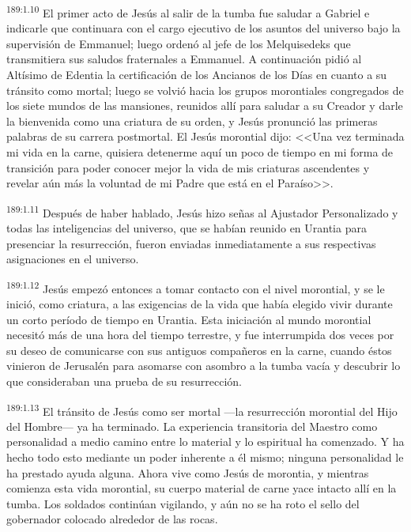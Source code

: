 \par 
\textsuperscript{189:1.10} El primer acto de Jesús al salir de la tumba fue saludar a Gabriel e indicarle que continuara con el cargo ejecutivo de los asuntos del universo bajo la supervisión de Emmanuel; luego ordenó al jefe de los Melquisedeks que transmitiera sus saludos fraternales a Emmanuel. A continuación pidió al Altísimo de Edentia la certificación de los Ancianos de los Días en cuanto a su tránsito como mortal; luego se volvió hacia los grupos morontiales congregados de los siete mundos de las mansiones, reunidos allí para saludar a su Creador y darle la bienvenida como una criatura de su orden, y Jesús pronunció las primeras palabras de su carrera postmortal. El Jesús morontial dijo: <<Una vez terminada mi vida en la carne, quisiera detenerme aquí un poco de tiempo en mi forma de transición para poder conocer mejor la vida de mis criaturas ascendentes y revelar aún más la voluntad de mi Padre que está en el Paraíso>>.

\par 
\textsuperscript{189:1.11} Después de haber hablado, Jesús hizo señas al Ajustador Personalizado y todas las inteligencias del universo, que se habían reunido en Urantia para presenciar la resurrección, fueron enviadas inmediatamente a sus respectivas asignaciones en el universo.

\par 
\textsuperscript{189:1.12} Jesús empezó entonces a tomar contacto con el nivel morontial, y se le inició, como criatura, a las exigencias de la vida que había elegido vivir durante un corto período de tiempo en Urantia. Esta iniciación al mundo morontial necesitó más de una hora del tiempo terrestre, y fue interrumpida dos veces por su deseo de comunicarse con sus antiguos compañeros en la carne, cuando éstos vinieron de Jerusalén para asomarse con asombro a la tumba vacía y descubrir lo que consideraban una prueba de su resurrección.

\par 
\textsuperscript{189:1.13} El tránsito de Jesús como ser mortal ---la resurrección morontial del Hijo del Hombre--- ya ha terminado. La experiencia transitoria del Maestro como personalidad a medio camino entre lo material y lo espiritual ha comenzado. Y ha hecho todo esto mediante un poder inherente a él mismo; ninguna personalidad le ha prestado ayuda alguna. Ahora vive como Jesús de morontia, y mientras comienza esta vida morontial, su cuerpo material de carne yace intacto allí en la tumba. Los soldados continúan vigilando, y aún no se ha roto el sello del gobernador colocado alrededor de las rocas.

